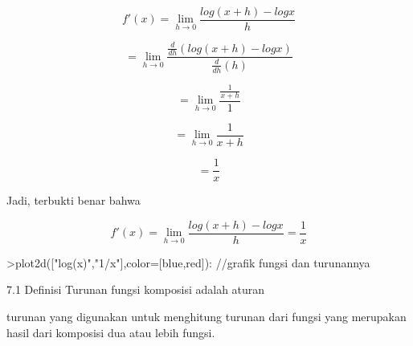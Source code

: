 \documentclass[a4paper,10pt]{article}
\begin{document}
\begin{eulernotebook}
\begin{eulercomment}
\begin{eulercomment}
\begin{eulercomment}
\begin{eulercomment}
\begin{eulercomment}
\begin{eulercomment}
\begin{eulercomment}
\begin{eulercomment}
\begin{eulercomment}
\begin{eulercomment}
\begin{eulercomment}
\begin{eulercomment}
\begin{eulercomment}
\begin{eulercomment}
\begin{eulercomment}
\begin{eulercomment}
\begin{eulercomment}
\begin{eulercomment}
\begin{eulercomment}
\begin{eulercomment}
\begin{eulercomment}
\end{eulercomment}
\begin{eulerformula}
\[
f'(x) = \lim_{h\to 0} \frac{log(x+h)-log x}{h}
\]
\end{eulerformula}
\begin{eulercomment}
\end{eulercomment}
\begin{eulerformula}
\[
=\lim_{h\to 0} \frac{\frac{d}{dh}(log(x+h)-log x)}{\frac{d}{dh}(h)}
\]
\end{eulerformula}
\begin{eulerformula}
\[
=\lim_{h\to 0} \frac{\frac{1}{x+h}}{1}
\]
\end{eulerformula}
\begin{eulerformula}
\[
=\lim_{h\to 0} \frac{1}{x+h}
\]
\end{eulerformula}
\begin{eulerformula}
\[
=\frac{1}{x}
\]
\end{eulerformula}
\begin{eulercomment}
Jadi, terbukti benar bahwa\\
\end{eulercomment}
\begin{eulerformula}
\[
f'(x) = \lim_{h\to 0} \frac{log(x+h)-log x}{h} = \frac{1}{x}
\]
\end{eulerformula}
\begin{eulerprompt}
>plot2d(["log(x)","1/x"],color=[blue,red]): //grafik fungsi dan turunannya
\end{eulerprompt}
\begin{eulercomment}
\begin{eulercomment}
\begin{eulercomment}
\end{eulercomment}
\begin{eulerttcomment}
      7.1 Definisi          Turunan fungsi komposisi adalah aturan
\end{eulerttcomment}
\begin{eulercomment}
turunan yang digunakan untuk menghitung turunan dari fungsi yang
merupakan hasil dari komposisi dua atau lebih fungsi.


\end{eulercomment}
\end{eulercomment}
\end{eulercomment}
\end{eulercomment}
\end{eulercomment}
\end{eulercomment}
\end{eulercomment}
\end{eulercomment}
\end{eulercomment}
\end{eulercomment}
\end{eulercomment}
\end{eulercomment}
\end{eulercomment}
\end{eulercomment}
\end{eulercomment}
\end{eulercomment}
\end{eulercomment}
\end{eulercomment}
\end{eulercomment}
\end{eulercomment}
\end{eulercomment}
\end{eulercomment}
\end{eulercomment}
\end{eulernotebook}
\end{document}
